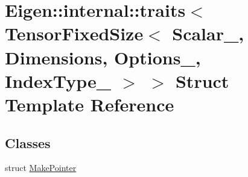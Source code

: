 \hypertarget{struct_eigen_1_1internal_1_1traits_3_01_tensor_fixed_size_3_01_scalar___00_01_dimensions_00_01_ocde4e51f48a16cc8d4f5161774f58603}{}\section{Eigen\+:\+:internal\+:\+:traits$<$ Tensor\+Fixed\+Size$<$ Scalar\+\_\+, Dimensions, Options\+\_\+, Index\+Type\+\_\+ $>$ $>$ Struct Template Reference}
\label{struct_eigen_1_1internal_1_1traits_3_01_tensor_fixed_size_3_01_scalar___00_01_dimensions_00_01_ocde4e51f48a16cc8d4f5161774f58603}
\subsection*{Classes}
\begin{DoxyCompactItemize}
\item 
struct \hyperlink{struct_eigen_1_1internal_1_1traits_3_01_tensor_fixed_size_3_01_scalar___00_01_dimensions_00_01_oec1d8e96ca2c261993f05f9c1095a180}{Make\+Pointer}
\end{DoxyCompactItemize}
